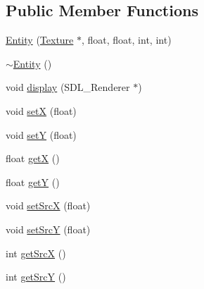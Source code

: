 \subsection*{Public Member Functions}
\begin{DoxyCompactItemize}
\item 
\hyperlink{class_entity_a8a572d724b689de57d3c0d8bafeff107}{Entity} (\hyperlink{class_texture}{Texture} $\ast$, float, float, int, int)
\item 
\hyperlink{class_entity_adf6d3f7cb1b2ba029b6b048a395cc8ae}{$\sim$\+Entity} ()
\item 
void \hyperlink{class_entity_a2224871711ac97a54af338ddefc25ac9}{display} (S\+D\+L\+\_\+\+Renderer $\ast$)
\item 
void \hyperlink{class_entity_a38e2f110d39426ba4823296b4294dd74}{set\+X} (float)
\item 
void \hyperlink{class_entity_a8896110a266bdec69b14d34ec6374df8}{set\+Y} (float)
\item 
float \hyperlink{class_entity_abc5b6d26c039bf3bf6faa766990768b4}{get\+X} ()
\item 
float \hyperlink{class_entity_ab6dd7b404c13754202acfe3d2c65c77b}{get\+Y} ()
\item 
void \hyperlink{class_entity_ad59969bacea528293341a88a94f845be}{set\+Src\+X} (float)
\item 
void \hyperlink{class_entity_a1051f4e046b0de7f4c727e0e0edb3f6f}{set\+Src\+Y} (float)
\item 
int \hyperlink{class_entity_a0b7bd3804adb0a5c4b611bcbef6c12cc}{get\+Src\+X} ()
\item 
int \hyperlink{class_entity_aeaf17603c70755e07dfc32d6bd4e0d2e}{get\+Src\+Y} ()
\end{DoxyCompactItemize}
